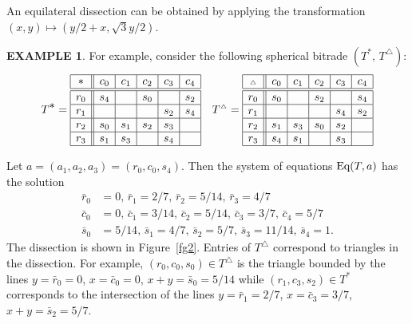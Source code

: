 \documentclass[12pt,amstags,fleqn]{article}
\theoremstyle{plain}
\theoremstyle{definition}
\theoremstyle{definition}
\newtheorem{example}[theorem]{EXAMPLE}
\def\ll{{\textstyle \ast}}
\def\rr{{\scriptscriptstyle \triangle}}
\begin{document}
An equilateral dissection can be obtained by applying the transformation
$(x,y) \mapsto (y/2 + x, \sqrt 3 y/2)$.

\begin{example}
For example, consider the following spherical bitrade 
$(T^{\ll},\, T^{\rr})$:  \\ 
\[
T^{\ll} = 
\begin{array}{|c||c|c|c|c|c|}
\hline \ll & c_0 & c_1 & c_2 & c_3 & c_4\\
\hline \hline r_0 & s_4 & ~ & s_0 & ~ & s_2\\
\hline r_1 & ~ & ~ & ~ & s_2 & s_4\\
\hline r_2 & s_0 & s_1 & s_2 & s_3 & ~\\
\hline r_3 & s_1 & s_3 & ~ & s_4 & ~\\
\hline \end{array} 
\quad 
T^{\rr} = 
\begin{array}{|c||c|c|c|c|c|}
\hline \rr & c_0 & c_1 & c_2 & c_3 & c_4\\
\hline \hline r_0 & s_0 & ~ & s_2 & ~ & s_4\\
\hline r_1 & ~ & ~ & ~ & s_4 & s_2\\
\hline r_2 & s_1 & s_3 & s_0 & s_2 & ~\\
\hline r_3 & s_4 & s_1 & ~ & s_3 & ~\\
\hline \end{array}
\label{eqnsphericalbitrade}
\]

Let $a = (a_1,a_2,a_3) = (r_0,c_0,s_4)$. Then the system of equations
$\textnormal{Eq}(T, a)$ has the solution
\begin{align*}
\bar r_0 &= 0,\, \bar r_1 = 2/7,\, \bar r_2 = 5/14,\, \bar r_3 = 4/7 \\
\bar c_0 &= 0,\, \bar c_1 = 3/14,\, \bar c_2 = 5/14,\, \bar c_3 = 3/7,\, \bar c_4 = 5/7 \\
\bar s_0 &= 5/14,\, \bar s_1 = 4/7,\, \bar s_2 = 5/7,\, \bar s_3 = 11/14,\, \bar s_4 = 1.
\end{align*}
The dissection is shown in Figure~\ref{fg2}.
 Entries of
$T^{\rr}$ correspond to triangles in the dissection. For example,
$(r_0,c_0,s_0) \in T^{\rr}$ is the triangle bounded by the lines
$y = \bar r_0 = 0$, 
$x = \bar c_0 = 0$, 
$x+y = \bar s_0 = 5/14$ while 
$(r_1,c_3,s_2) \in T^{\ll}$ corresponds to the intersection of the
lines
$y = \bar r_1 = 2/7$, 
$x = \bar c_3 = 3/7$, 
$x+y = \bar s_2 = 5/7$.
\end{example}
\end{document}
